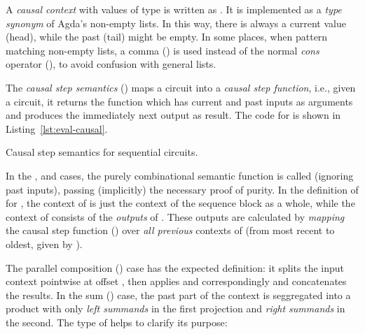             A \emph{causal context} with values of type  is written as  .
            It is implemented as a \emph{type synonym} of Agda's non-empty lists.
            In this way, there is always a current value (head), while the past (tail) might be empty.
            In some places, when pattern matching non-empty lists, a comma (\AI{\_,\_}) is used
            instead of the normal \emph{cons} operator (), to avoid confusion with general lists.

            The \emph{causal step semantics} () maps a circuit into a \emph{causal step function},
            i.e., given a circuit, it returns the function which has current and past inputs as arguments
            and produces the immediately next output as result.
            The code for  is shown in Listing~\ref{lst:eval-causal}.

            \begin{listing}[h]
                \caption{Causal step semantics for sequential circuits.\label{lst:eval-causal}}
            \end{listing}

            In the ,  and  cases, the purely combinational semantic function
            is called (ignoring past inputs), passing (implicitly) the necessary proof of purity.
            In the definition of  for , the context of  is just the context
            of the sequence block as a whole, while the context of  consists of the \emph{outputs}
            of .
            These outputs are calculated by \emph{mapping} the causal step function ()
            over \emph{all previous} contexts of  (from most recent to oldest, given by ).

            The parallel composition () case has the expected definition:
            it splits the input context pointwise at offset ,
            then applies    and    correspondingly and concatenates the results.
            In the sum () case, the past part of the context is seggregated into a product
            with only \emph{left summands} in the first projection and \emph{right summands} in the second.
            The type of  helps to clarify its purpose:

            \begin{center}
            \end{center}

